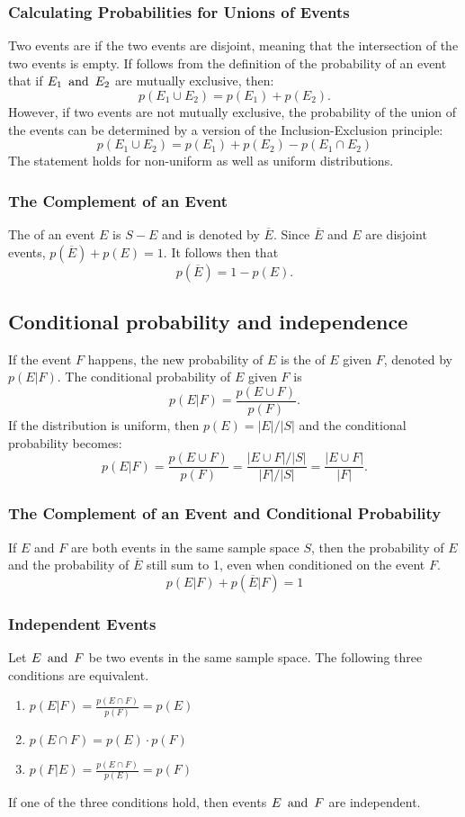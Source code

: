 \subsubsection*{Calculating Probabilities for Unions of Events}
Two events are  if the two events are disjoint, meaning that the intersection of the two events is empty. If follows from the definition of the probability of an event that if $E_1 \operatorname{~\text{and}~} E_2$ are mutually exclusive, then:
\[
  p(E_1 \cup E_2) = p(E_1) + p(E_2).
\]
However, if two events are not mutually exclusive, the probability of the union of the events can be determined by a version of the Inclusion-Exclusion principle:
\[
  p(E_1 \cup E_2) = p(E_1) + p(E_2) - p(E_1 \cap E_2)
\]
The statement holds for non-uniform as well as uniform distributions.

\subsubsection*{The Complement of an Event}
The  of an event $E$ is $S-E$ and is denoted by $\overline{E}$. Since $\overline{E}$ and $E$ are disjoint events, $p(\overline{E}) + p(E) = 1$. It follows then that
\[
  p(\overline{E}) = 1 - p(E).
\]

\subsection{Conditional probability and independence}
If the event $F$ happens, the new probability of $E$ is the  of $E$ given $F$, denoted by $p(E|F)$. The conditional probability of $E$ given $F$ is
\[
  p(E|F) = \frac{p(E \cup F)}{p(F)}.
\]
If the distribution is uniform, then $p(E) = |E|/|S|$ and the conditional probability becomes:
\[
  p(E|F) = \frac{p(E \cup F)}{p(F)} = \frac{|E \cup F|/|S|}{|F|/|S|} = \frac{|E \cup F|}{|F|}.
\]

\subsubsection*{The Complement of an Event and Conditional Probability}
If $E$ and $F$ are both events in the same sample space $S$, then the probability of $E$ and the probability of $\overline{E}$ still sum to 1, even when conditioned on the event $F$.
\[
  p(E|F) + p(\overline{E}|F) = 1
\]

\subsubsection*{Independent Events}
Let $E \operatorname{~\text{and}~} F$ be two events in the same sample space. The following three conditions are equivalent.
\begin{enumerate}
  \item $p(E|F) = \frac{p(E \cap F)}{p(F)} = p(E)$
  \item $p(E \cap F) = p(E) \cdot p(F)$
  \item $p(F|E) = \frac{p(E \cap F)}{p(E)} = p(F)$
\end{enumerate}
If one of the three conditions hold, then events $E \operatorname{~\text{and}~} F$ are independent.

